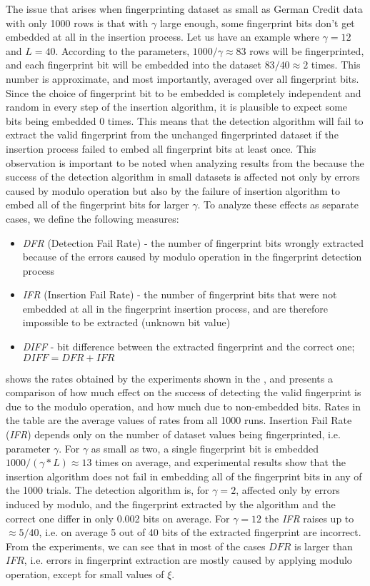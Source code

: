 The issue that arises when fingerprinting dataset as small as German Credit data with only 1000 rows is that with $\gamma$ large enough, some fingerprint bits don't get embedded at all in the insertion process. 
Let us have an example where $\gamma=12$ and $L=40$. 
According to the parameters, $1000/\gamma \approx 83$ rows will be fingerprinted, and each fingerprint bit will be embedded into the dataset $83/40\approx2$ times. 
This number is approximate, and most importantly, averaged over all fingerprint bits. 
Since the choice of fingerprint bit to be embedded is completely independent and random in every step of the insertion algorithm, it is plausible to expect some bits being embedded 0 times.
This means that the detection algorithm will fail to extract the valid fingerprint from the unchanged fingerprinted dataset if the insertion process failed to embed all fingerprint bits at least once.
This observation is important to be noted when analyzing results from the  because the success of the detection algorithm in small datasets is affected not only by errors caused by modulo operation but also by the failure of insertion algorithm to embed all of the fingerprint bits for larger $\gamma$.
To analyze these effects as separate cases, we define the following measures:
\begin{itemize}
    \item \textit{DFR} (Detection Fail Rate) - the number of fingerprint bits wrongly extracted because of the errors caused by modulo operation in the fingerprint detection process
    \item \textit{IFR} (Insertion Fail Rate) - the number of fingerprint bits that were not embedded at all in the fingerprint insertion process, and are therefore impossible to be extracted (unknown bit value)
    \item \textit{DIFF} - bit difference between the extracted fingerprint and the correct one; $DIFF = DFR + IFR$
\end{itemize}
 shows the rates obtained by the experiments shown in the , and presents a comparison of how much effect on the success of detecting the valid fingerprint is due to the modulo operation, and how much due to non-embedded bits. 
Rates in the table are the average values of rates from all 1000 runs. 
Insertion Fail Rate (\textit{IFR}) depends only on the number of dataset values being fingerprinted, i.e. parameter $\gamma$.
For $\gamma$ as small as two, a single fingerprint bit is embedded $1000/(\gamma * L) \approx 13$ times on average, and experimental results show that the insertion algorithm does not fail in embedding all of the fingerprint bits in any of the 1000 trials. 
The detection algorithm is, for $\gamma=2$, affected only by errors induced by modulo, and the fingerprint extracted by the algorithm and the correct one differ in only 0.002 bits on average.
For $\gamma = 12$ the \textit{IFR} raises up to $\approx5 / 40$, i.e. on average 5 out of 40 bits of the extracted fingerprint are incorrect.
From the experiments, we can see that in most of the cases $DFR$ is larger than $IFR$, i.e. errors in fingerprint extraction are mostly caused by applying modulo operation, except for small values of $\xi$. 

